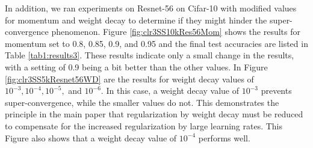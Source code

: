 \documentclass{article}
\begin{document}
	
	
	
	
	
	In addition, we ran experiments on Resnet-56 on Cifar-10 with modified values for momentum and weight decay to determine if they might hinder the super-convergence phenomenon.
	Figure \ref{fig:clr3SS10kRes56Mom} shows the results for momentum set to 0.8, 0.85, 0.9, and 0.95 and the final test accuracies are listed in Table \ref{tab1:results3}.
	These results indicate only a small change in the results, with a setting of 0.9 being a bit better than the other values.
	In Figure \ref{fig:clr3SS5kResnet56WD} are the results for weight decay values of $ 10^{-3},  10^{-4},  10^{-5},$ and $10^{-6}$.
	In this case, a weight decay value of $ 10^{-3} $ prevents  super-convergence, while the smaller values do not.
	This demonstrates the principle in the main paper that regularization by weight decay must be reduced to compensate for the increased regularization by large learning rates.
	This Figure also shows that  a weight decay value of $ 10^{-4} $ performs well.
\end{document}
